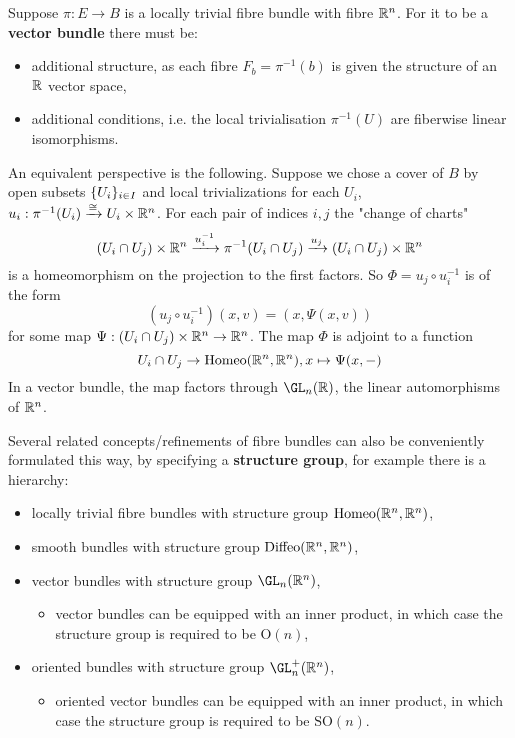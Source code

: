 \begin{remark}

Suppose $\pi:E\to B$ is a locally trivial fibre bundle with fibre ${\mathbb R}^n$. For it to be a \textbf{vector bundle} there must be:
\begin{itemize}[label={-}]
    \item additional structure, as each fibre $F_b=\pi^{-1}(b)$ is given the structure of an ${\mathbb R}$ vector space,
    \item  additional conditions, i.e. the local trivialisation $\pi^{-1}(U)$ are fiberwise linear isomorphisms.
\end{itemize}

An equivalent perspective is the following. Suppose we chose a cover of $B$ by open subsets $\{U_i\}_{i\in I}$ and local trivializations for each $U_i$, $u_i:\pi^{-1}(U_i)\xrightarrow{\cong} U_i\times{\mathbb R}^n$. For each pair of indices $i,j$ the "change of charts"
\[(U_i\cap U_j)\times{\mathbb R}^n\xrightarrow{u_i^{-1}}\pi^{-1}(U_i\cap U_j)\xrightarrow{u_j}(U_i\cap U_j)\times{\mathbb R}^n\]
is a homeomorphism on the projection to the first factors. So $\Phi=u_j\circ u_i^{-1}$ is of the form
\[(u_j\circ u_i^{-1})(x,v)=(x,\Psi(x,v))\]
for some map $\Psi:(U_i\cap U_j)\times{\mathbb R}^n\to{\mathbb R}^n$. The map $\Phi$ is adjoint to a function
\[U_i\cap U_j\to\operatorname{Homeo}({\mathbb R}^n,{\mathbb R}^n), x\mapsto\Psi(x,-)\]
In a vector bundle, the map factors through $\GL_n(\R)$, the linear automorphisms of ${\mathbb R}^n$.

Several related concepts/refinements of fibre bundles can also be conveniently formulated this way, by specifying a \textbf{structure group}, for example there is a hierarchy:
\begin{itemize}
    \item locally trivial fibre bundles with structure group $\operatorname{Homeo}({\mathbb R}^n,{\mathbb R}^n)$,
    \item smooth bundles with structure group $\operatorname{Diffeo}({\mathbb R}^n,{\mathbb R}^n)$,
    \item vector bundles with structure group $\GL_n(\R^n)$,
    \begin{itemize}
        \item vector bundles can be equipped with an inner product, in which case the structure group is required to be $\text{O}(n)$, 
    \end{itemize}
    \item oriented bundles with structure group $\GL_n^+(\R^n)$,
    \begin{itemize}
        \item oriented vector bundles can be equipped with an inner product, in which case the structure group is required to be $\text{SO}(n)$.
    \end{itemize}
\end{itemize}

\end{remark}
